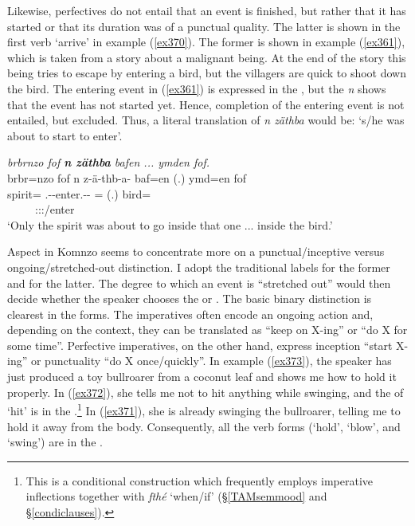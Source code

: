 Likewise, perfectives do not entail that an event is finished, but rather that it has started or that its duration was of a punctual quality. The latter is shown in the first verb `arrive' in example (\ref{ex370}). The former is shown in example (\ref{ex361}), which is taken from a story about a malignant being. At the end of the story this being tries to escape by entering a bird, but the villagers are quick to shoot down the bird. The entering event in (\ref{ex361}) is expressed in the , but the   \emph{n} shows that the event has not started yet. Hence, completion of the entering event is not entailed, but excluded. Thus, a literal translation of \emph{n zäthba} would be: `s/he was about to start to enter'.

\begin{exe}
	\ex \emph{brbrnzo fof \textbf{n zäthba} bafen ... ymden fof.}\\
	\glll brbr=nzo fof n z-ä-thb-a-\Zero{} baf=en (.) ymd=en fof\\
	spirit={\Only} {\Emph} {\Imn} \M.\Gam-\Ndu-enter.\Rs-\Pst-\Stsg{} \Recog={\Loc} (.) bird={\Loc} {\Emph}\\
	~ ~ ~ {\footnotesize \Stsg:\Sbj:\Pst:\Pfv/enter} ~ ~ ~ ~\\
	\trans `Only the spirit was about to go inside that one ... inside the bird.'\\ 
	\label{ex361}
\end{exe}

Aspect in Komnzo seems to concentrate more on a punctual/inceptive versus ongoing/{\linebreak}stretched-out distinction. I adopt the traditional labels  for the former and  for the latter. The degree to which an event is ``stretched out'' would then decide whether the speaker chooses the  or  . The basic binary distinction is clearest in the  forms. The  imperatives often encode an ongoing action and, depending on the context, they can be translated as ``keep on X-ing'' or ``do X for some time''. Perfective imperatives, on the other hand, express inception ``start X-ing'' or punctuality ``do X once/quickly''. In example (\ref{ex373}), the speaker has just produced a toy bullroarer from a coconut leaf and shows me how to hold it properly. In (\ref{ex372}), she tells me not to hit anything while swinging, and the  of `hit' is in the .\footnote{This is a conditional construction which frequently employs imperative inflections together with \emph{fthé} `when/if' ({\S}\ref{TAMsemmood} and \S\ref{condiclauses}).} In (\ref{ex371}), she is already swinging the bullroarer, telling me to hold it away from the body. Consequently, all the  verb forms (`hold', `blow', and `swing') are in the .

